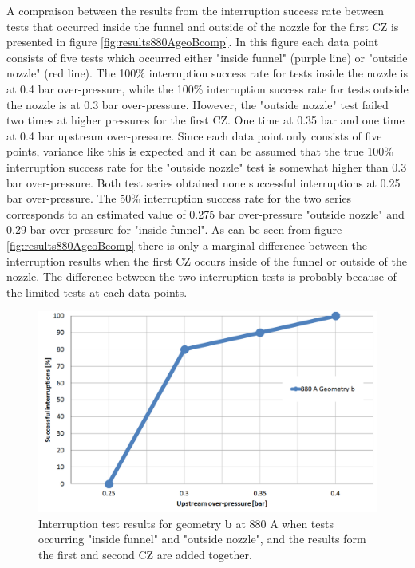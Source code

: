 \documentclass[10pt,b5paper,twoside]{article}
\begin{document}
A compraison between the results from the interruption success rate between tests that occurred inside the funnel and outside of the nozzle for the first CZ is presented in figure \ref{fig:results880AgeoBcomp}. In this figure each data point consists of five tests which occurred either "inside funnel" (purple line) or "outside nozzle" (red line). The 100\% interruption success rate for tests inside the nozzle is at 0.4 bar over-pressure, while the 100\% interruption success rate for tests outside the nozzle is at 0.3 bar over-pressure. However, the "outside nozzle" test failed two times at higher pressures for the first CZ. One time at 0.35 bar and one time at 0.4 bar upstream over-pressure. Since each data point only consists of five points, variance like this is expected and it can be assumed that the true 100\% interruption success rate for the "outside nozzle" test is somewhat higher than 0.3 bar over-pressure. Both test series obtained none successful interruptions at 0.25 bar over-pressure. The 50\% interruption success rate for the two series corresponds to an estimated value of 0.275 bar over-pressure "outside nozzle" and 0.29 bar over-pressure for "inside funnel". As can be seen from figure \ref{fig:results880AgeoBcomp} there is only a marginal difference between the interruption results when the first CZ occurs inside of the funnel or outside of the nozzle. The difference between the two interruption tests is probably because of the limited tests at each data points.

\begin{figure}[H]
\centering
\includegraphics[scale=0.45]{Bilder/Results/geoB880amp.PNG}
\caption{Interruption test results for geometry \textbf{b} at 880 A when tests occurring "inside funnel" and "outside nozzle", and the results form the first and second CZ are added together.} \label{fig:results880AgeoB}
\end{figure}
\end{document}
